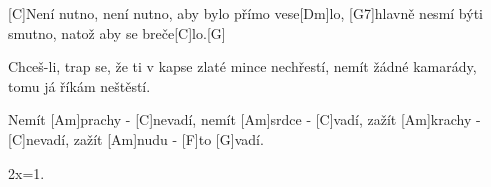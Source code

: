 
[C]Není nutno, není nutno, aby bylo přímo vese[Dm]lo,
[G7]hlavně nesmí býti smutno, natož aby se breče[C]lo.[G]

Chceš-li, trap se, že ti v kapse zlaté mince nechřestí,
nemít žádné kamarády, tomu já říkám neštěstí.

Nemít [Am]prachy - [C]nevadí, nemít [Am]srdce - [C]vadí,
zažít [Am]krachy - [C]nevadí, zažít [Am]nudu - [F]to [G]vadí.

2x=1.




